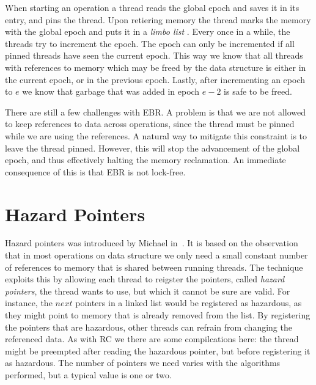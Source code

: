 \documentclass[a4paper,twoside]{report}
\begin{document}
When starting an operation a thread reads the global epoch and saves it in its
entry, and pins the thread.  Upon retiering memory the thread marks the memory
with the global epoch and puts it in a \emph{limbo list} .  Every once in a while, the threads try to
increment the epoch.  The epoch can only be incremented if all pinned threads
have seen the current epoch. This way we know that all threads with references
to memory which may be freed by the data structure is either in the current
epoch, or in the previous epoch.  Lastly, after incrementing an epoch to $e$ we
know that garbage that was added in epoch $e-2$ is safe to be freed.


There are still a few challenges with EBR.  A problem is that we are not
allowed to keep references to data across operations, since the thread must be
pinned while we are using the references.  A natural way to mitigate this
constraint is to leave the thread pinned.  However, this will stop the
advancement of the global epoch, and thus effectively halting the memory
reclamation.  An immediate consequence of this is that EBR is not lock-free.



\section{Hazard Pointers}

Hazard pointers was introduced by Michael in~\cite{michael2004hazard}.  It is
based on the observation that in most operations on data structure we only need
a small constant number of references to memory that is shared between running
threads. The technique exploits this by allowing each thread to reigster the
pointers, called \emph{hazard pointers}, the thread wants to use, but which it
cannot be sure are valid.  For instance, the $next$ pointers in a linked list
would be registered as hazardous, as they might point to memory that is already
removed from the list.  By registering the pointers that are hazardous, other
threads can refrain from changing the referenced data.  As with RC we there are
some compilcations here: the thread might be preempted after reading the
hazardous pointer, but before registering it as hazardous.  The number of
pointers we need varies with the algorithms performed, but a typical value is
one or two.
\end{document}
